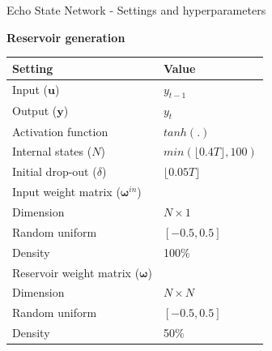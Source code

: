 \documentclass[aspectratio=169]{beamer}
\begin{document}
\begin{frame}[t]{Echo State Network  - Settings and hyperparameters}
    \begin{minipage}[t]{0.5\textwidth}
        \vspace{0pt}
        \textbf{Reservoir generation}
        	\begin{table}[ht]
        	\scriptsize
			\centering
				\begin{tabular}{ll}
				\toprule
				\textbf{Setting}                                    & \textbf{Value}                   \\
				\midrule
				Input ($\mathbf{u}$)                                & $y_{t-1}$                        \\
				Output ($\mathbf{y}$)                               & $y_{t}$                          \\
				Activation function                                 & $tanh(.)$                        \\
				Internal states ($N$)                               & $min(\lfloor 0.4T \rfloor, 100)$ \\
				Initial drop-out ($\delta$)                         & $\lfloor 0.05T \rfloor$          \\
				\midrule
				Input weight matrix ($\boldsymbol{\omega}^{in}$)    &                                  \\
				\hspace{2.5mm} Dimension                            & $N \times 1$                     \\
				\hspace{2.5mm} Random uniform                       & $[-0.5, 0.5]$                    \\
				\hspace{2.5mm} Density                              & 100\%                            \\
				\midrule
				Reservoir weight matrix ($\boldsymbol{\omega}$)     &                                  \\
				\hspace{2.5mm} Dimension                            & $N \times N$                     \\
				\hspace{2.5mm} Random uniform                       & $[-0.5, 0.5]$                    \\
				\hspace{2.5mm} Density                              & 50\%                             \\

\end{tabular}
\end{table}
\end{minipage}
\end{frame}
\end{document}
